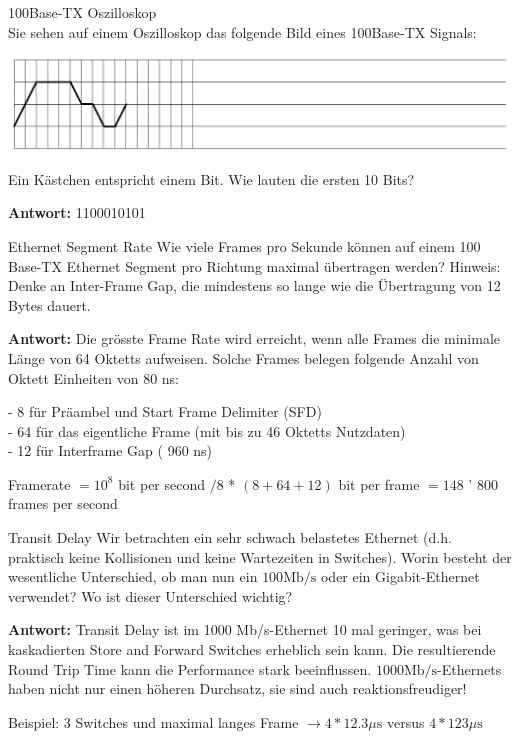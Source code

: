 \begin{example2}{100Base-TX Oszilloskop}\\
 Sie sehen auf einem Oszilloskop das folgende Bild eines 100Base-TX Signals:
  \begin{center}
  \includegraphics[width=0.8\linewidth]{images/2024-06-20-17-47-36.png}
  \end{center}
Ein Kästchen entspricht einem Bit. Wie lauten die ersten 10 Bits?

\textbf{Antwort:}
1100010101
\end{example2}


\begin{example2}{Ethernet Segment Rate}
Wie viele Frames pro Sekunde können auf einem 100 Base-TX Ethernet Segment pro Richtung maximal übertragen werden?
Hinweis: Denke an Inter-Frame Gap, die mindestens so lange wie die Übertragung von 12 Bytes dauert.

\textbf{Antwort:}
Die grösste Frame Rate wird erreicht, wenn alle Frames die minimale Länge von 64 Oktetts aufweisen. Solche Frames belegen folgende Anzahl von Oktett Einheiten von 80 ns:

- 8 für Präambel und Start Frame Delimiter (SFD)\\
- 64 für das eigentliche Frame (mit bis zu 46 Oktetts Nutzdaten)\\
- 12 für Interframe Gap ( 960 ns)

Framerate $=10^{8}$ bit per second $/ 8$ * $(8+64+12)$ bit per frame $=148$ ' 800 frames per second
\end{example2}


\begin{example2}{Transit Delay}
Wir betrachten ein sehr schwach belastetes Ethernet (d.h. praktisch keine Kollisionen und keine Wartezeiten in Switches). Worin besteht der wesentliche Unterschied, ob man nun ein $100 \mathrm{Mb} / \mathrm{s}$ oder ein Gigabit-Ethernet verwendet? Wo ist dieser Unterschied wichtig?

\textbf{Antwort:}
Transit Delay ist im 1000 Mb/s-Ethernet 10 mal geringer, was bei kaskadierten Store and Forward Switches erheblich sein kann. Die resultierende Round Trip Time kann die Performance stark beeinflussen. $1000 \mathrm{Mb} / \mathrm{s}$-Ethernets haben nicht nur einen höheren Durchsatz, sie sind auch reaktionsfreudiger!

Beispiel: 3 Switches und maximal langes Frame $\rightarrow 4 * 12.3 \mu \mathrm{s}$ versus $4 * 123 \mu \mathrm{s}$
\end{example2}


